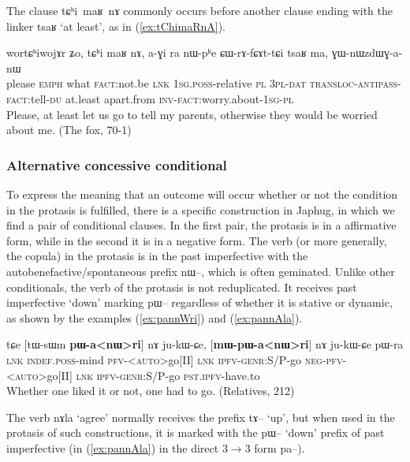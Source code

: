 \documentclass[oldfontcommands,oneside,a4paper,11pt]{article}
\newcommand{\ipa}[1]{{\phon \mbox{#1}}} %
\newcommand{\refb}[1]{(\ref{#1})}
\begin{document}
The clause \ipa{tɕʰi maʁ nɤ} commonly occurs before another clause ending with the linker \ipa{tsaʁ} `at least', as in \refb{ex:tChimaRnA}.
\begin{exe}
\ex  \label{ex:tChimaRnA}
\gll
\ipa{wortɕʰiwojɤr} 	\ipa{ʑo,} 	\ipa{tɕʰi} 	\ipa{maʁ} 	\ipa{nɤ,} 	\ipa{a-ɣi} 	\ipa{ra} 	\ipa{nɯ-pʰe} 	\ipa{ɕɯ-rɤ-fɕɤt-tɕi} 	\ipa{tsaʁ} 	\ipa{ma,} 	\ipa{ɣɯ-nɯzdɯɣ-a-nɯ} 	 \\
please \textsc{emph} what \textsc{fact}:not.be \textsc{lnk} \textsc{1sg.poss}-relative \textsc{pl} \textsc{3pl-dat} \textsc{transloc-antipass-fact}:tell-\textsc{du} at.least  apart.from \textsc{inv}-\textsc{fact}:worry.about-\textsc{1sg-pl} \\
\glt Please, at least let us go to tell my parents, otherwise they would be worried about me. (The fox, 70-1)

\end{exe}
\subsubsection{Alternative concessive conditional}
To express the meaning that an outcome will occur whether or not the condition in the protasis is fulfilled, there is a specific construction in Japhug, in which we find a pair of conditional clauses. In the first pair, the protasis is in a affirmative form, while in the second it is in a negative form. The verb (or more generally, the copula) in the protasis  is in the past imperfective with the autobenefactive/spontaneous prefix \ipa{nɯ--}, which is often geminated. Unlike other conditionals, the verb of the protasis is not reduplicated. It receives past imperfective `down' marking \ipa{pɯ}-- regardless of whether it is stative or dynamic, as shown by the examples \refb{ex:pannWri} and \refb{ex:pannAla}.


\begin{exe}
\ex  \label{ex:pannWri}
\gll
\ipa{tɕe}  	[\ipa{tɯ-sɯm}  	\textbf{\ipa{pɯ-a<nɯ>ri}}]  	\ipa{nɤ}  	\ipa{ju-kɯ-ɕe,}  	[\textbf{\ipa{mɯ-pɯ-a<nɯ>ri}}]  	\ipa{nɤ}  	\ipa{ju-kɯ-ɕe}  	\ipa{pɯ-ra}  \\
\textsc{lnk} \textsc{indef.poss}-mind  \textsc{pfv-<auto>}go[II] \textsc{lnk} \textsc{ipfv-genr}:S/P-go \textsc{neg-pfv-<auto>}go[II] \textsc{lnk} \textsc{ipfv-genr}:S/P-go \textsc{pst.ipfv}-have.to \\
\glt Whether one liked it or not, one had to go. (Relatives, 212)
\end{exe}

The verb \ipa{nɤla} `agree' normally receives the prefix \ipa{tɤ}-- `up', but when used in the protasis of such constructions, it is marked with the \ipa{pɯ}-- `down' prefix of past imperfective (in \refb{ex:pannAla} in the direct 3$\rightarrow$3 form \ipa{pa}--).
\end{document}
